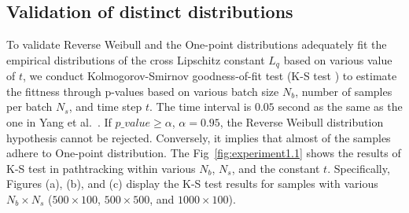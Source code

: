 \documentclass[conference]{IEEEtran}
\begin{document}
\subsection{Validation of distinct distributions}\label{exam:validation}

To validate Reverse Weibull and the One-point distributions 
adequately fit the empirical distributions of the 
cross Lipschitz constant $L_{q}$ 
based on various value of $t$, 
we conduct 
Kolmogorov-Smirnov goodness-of-fit test 
(K-S test \cite{massey1951kolmogorov}) 
to estimate the fittness through p-values 
based on various batch size $N_b$, 
number of samples per batch $N_s$, and 
time step $t$. 
The time interval is $0.05$ second as 
the same as the one in Yang et al.~\cite{yanglyapunov}. 
If $p\_value \geq \alpha$, $\alpha = 0.95$, 
the Reverse Weibull distribution 
hypothesis cannot be rejected. 
Conversely, it implies that almost of the samples 
adhere to One-point distribution. 
The Fig~\ref{fig:experiment1.1} shows the 
results of K-S test in pathtracking within various 
$N_b$, $N_s$, and the constant $t$. 
Specifically, Figures (a), (b), and (c) 
display the K-S test results for samples with 
various $N_b \times N_s$ 
($500\times 100$, $500\times 500$, and 
$1000\times 100$). 
\end{document}
